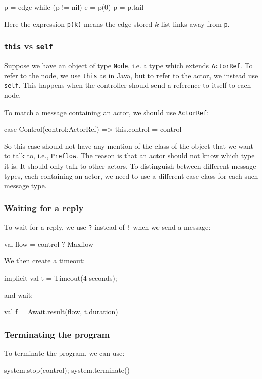 \documentclass{forsete}
\begin{document}
{\begin{ccode}
p = edge
while (p != nil) {
	e = p(0)
	p = p.tail
}
\end{ccode}

Here the expression \verb.p(k). means the edge stored $k$ list links away from \verb.p..

\subsubsection*{{\tt this} vs {\tt self}}

Suppose we have an object of type \verb.Node., i.e. a type which extends \verb.ActorRef..
To refer to the node, we use {\tt this} as in Java, but to refer to the actor, 
we instead use {\tt self}. This happens when the controller should send a reference to itself to
each node.

To match a message containing an actor, we should use \verb.ActorRef.:

\begin{ccode}
case Control(control:ActorRef)	=> this.control = control
\end{ccode}
So this case should not have any mention of the class of the object that we want to talk to, i.e., {\tt Preflow}.
The reason is that an actor should not know which type it is. It should only talk to other actors.
To distinguish between different message types, each containing an actor, we need to use a 
different case class for each such message type.

\subsubsection*{Waiting for a reply}
To wait for a reply, we use \verb.?. instead of \verb.!. when we send a message:

\begin{ccode}
val flow = control ? Maxflow
\end{ccode}
We then create a timeout:
\begin{ccode}
implicit val t = Timeout(4 seconds);
\end{ccode}
and wait:
\begin{ccode}
val f = Await.result(flow, t.duration)
\end{ccode}
\subsubsection*{Terminating the program}
To terminate the program, we can use:
\begin{ccode}
system.stop(control);
system.terminate()
\end{ccode}

}
\end{document}
